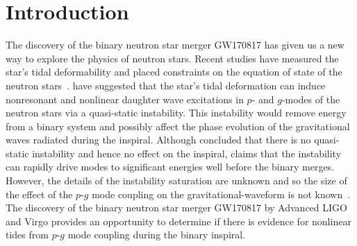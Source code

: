 \section{Introduction} \label{sec:intro}
The discovery of the binary neutron star merger GW170817 \citep{TheLIGOScientific:2017qsa} has given us a new way to explore the physics of neutron stars. Recent studies have measured the star's tidal deformability and placed constraints on the equation of state of the neutron stars~\citep{TheLIGOScientific:2017qsa,Tews:2018iwm,Most:2018eaw,Raithel:2018ncd,de2018tidal,Abbott:2018exr,Abbott:2018wiz,Radice:2018ozg,LIGOScientific:2019eut,Capano:2019eae}.
\cite{Weinberg:2013pbi} have suggested that the star's tidal deformation can induce nonresonant and nonlinear daughter wave excitations in $p$- and $g$-modes of the neutron stars via a quasi-static instability. This instability would remove energy from a binary system and possibly affect the phase evolution of the gravitational waves radiated during the inspiral. Although \cite{Venumadhav:2013nla} concluded that there is no quasi-static instability and hence no effect on the inspiral, \cite{Weinberg:2015pxa} claims that the instability can rapidly drive modes to significant energies well before the binary merges. However, the details of the instability saturation are unknown and so the size of the effect of the $p$-$g$ mode coupling on the gravitational-waveform is not known~\citep{Weinberg:2015pxa}. The discovery of the binary neutron star merger GW170817 by Advanced LIGO and Virgo provides an opportunity to determine if there is evidence for nonlinear tides from $p$-$g$ mode coupling during the binary inspiral.

